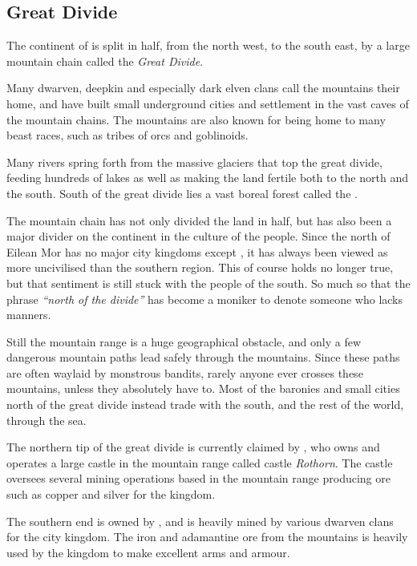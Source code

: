 \subsection{Great Divide}
\label{sec:Great Divide}

The continent of  is split in half, from the north west,
to the south east, by a large mountain chain called the \emph{Great Divide}.

Many dwarven, deepkin and especially dark elven clans call the mountains their
home, and have built small underground cities and settlement in the vast caves
of the mountain chains. The mountains are also known for being home to many
beast races, such as tribes of orcs and goblinoids.

Many rivers spring forth from the massive glaciers that top the great divide,
feeding hundreds of lakes as well as making the land fertile both to the north
and the south. South of the great divide lies a vast boreal forest called the
.

The mountain chain has not only divided the land in half, but has also been
a major divider on the continent in the culture of the people. Since the north
of Eilean Mor has no major city kingdoms except , it has
always been viewed as more uncivilised than the southern region. This of
course holds no longer true, but that sentiment is still stuck with the people
of the south. So much so that the phrase \emph{``north of the divide''} has
become a moniker to denote someone who lacks manners.

Still the mountain range is a huge geographical obstacle, and only a few
dangerous mountain paths lead safely through the mountains. Since these paths
are often waylaid by monstrous bandits, rarely anyone ever crosses these
mountains, unless they absolutely have to. Most of the baronies and small
cities north of the great divide instead trade with the south, and the rest
of the world, through the sea.

The northern tip of the great divide is currently claimed by
, who owns and operates a large castle in the mountain
range called castle \emph{Rothorn}. The castle oversees several mining
operations based in the mountain range producing ore such as copper and silver
for the kingdom.

The southern end is owned by , and is heavily mined
by various dwarven clans for the city kingdom. The iron and adamantine ore
from the mountains is heavily used by the kingdom to make excellent arms and
armour.
